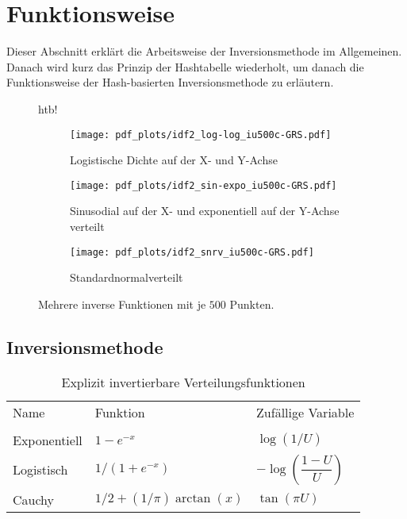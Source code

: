 \section{Funktionsweise}
\label{funktion}

Dieser Abschnitt erklärt die Arbeitsweise der Inversionsmethode im Allgemeinen. Danach wird kurz das Prinzip 
der Hashtabelle wiederholt, um danach die Funktionsweise der Hash-basierten Inversionsmethode zu erläutern.

\begin{figure*}{htb!}
    \centering
    \begin{subfigure}[b]{.3\textwidth}
        \centering
        \texttt{[image: pdf\_plots/idf2\_log-log\_iu500c-GRS.pdf]}
        \caption{Logistische Dichte auf der X- und Y-Achse}
        \label{fig:loglog_examplePlot}
    \end{subfigure}
    \hfill
    \begin{subfigure}[b]{.3\textwidth}
        \centering
        \texttt{[image: pdf\_plots/idf2\_sin-expo\_iu500c-GRS.pdf]}
        \caption{Sinusodial auf der X- und exponentiell auf der Y-Achse verteilt}
        \label{fig:sinexpo_examplePlot}
    \end{subfigure}
    \hfill
    \begin{subfigure}[b]{.3\textwidth}
        \centering
        \texttt{[image: pdf\_plots/idf2\_snrv\_iu500c-GRS.pdf]}
        \caption{Standardnormalverteilt}
        \label{fig:snrv_examplePlot}
    \end{subfigure}
    \caption{Mehrere inverse Funktionen mit je $500$ Punkten.}
    \label{fig:examplePlot}
\end{figure*}


\subsection{Inversionsmethode}
\begin{table}[htb!]
    \centering
    \begin{tabular}{lll}
    Name         & Funktion & Zufällige Variable \\
                 &          &                    \\
    Exponentiell & $1 - e^{-x}$ & $\log(1/U)$ \\
    Logistisch   & $1 / (1 + e^{-x})$ & $-\log(\dfrac{1-U}{U})$ \\
    Cauchy       & $1/2 + (1/\pi) \arctan(x)$ & $\tan(\pi U)$
    \end{tabular}
    \caption{Explizit invertierbare Verteilungsfunktionen \cite{devroye-non_uniform_random_variate-1986}}
    \label{tab:invFuncs}
\end{table}

